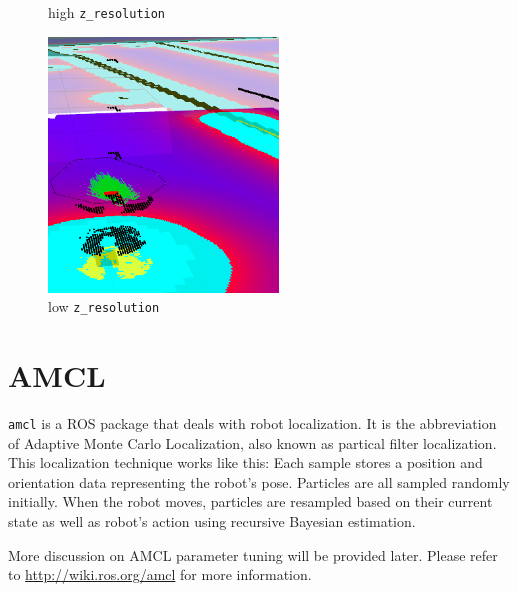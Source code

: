\documentclass[12pt]{article}
\begin{document}
\begin{figure}[!h]
  \caption{high \texttt{z\_resolution}}
\endminipage\hfill
{}
  \includegraphics[width=\linewidth]{voxellayerparam2.png}
  \caption{low \texttt{z\_resolution}}
\endminipage\hfill
\end{figure}

\section{AMCL}

\texttt{amcl} is a ROS package that deals with robot localization. It is the abbreviation of Adaptive Monte Carlo Localization, also known as partical filter localization. This localization technique works like this: Each sample stores a position and orientation data representing the robot's pose. Particles are all sampled randomly initially. When the robot moves, particles are resampled based on their current state as well as robot's action using recursive Bayesian estimation.

More discussion on AMCL parameter tuning will be provided later. Please refer to \url{http://wiki.ros.org/amcl} for more information.

\end{document}
